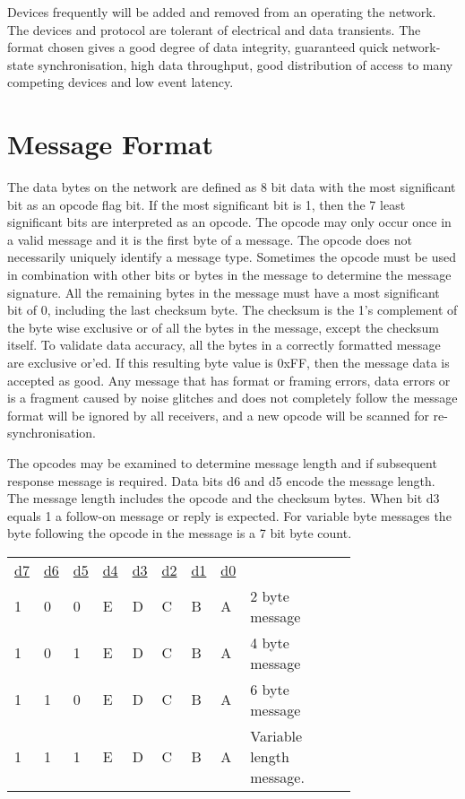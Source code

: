 Devices frequently will be added and removed from an operating the network. The devices and protocol are tolerant of electrical and data transients. The format chosen gives a good degree of data integrity, guaranteed quick network-state synchronisation, high data throughput, good distribution of access to many competing devices and low event latency. 

\section{Message Format}

The data bytes on the network are defined as 8 bit data with the most significant bit as an opcode flag bit. If the most significant bit is 1, then the 7 least significant bits are interpreted as an \gls{opcode}. The opcode may only occur once in a valid message and it is the first byte of a message. The opcode does not necessarily uniquely identify a message type. Sometimes the opcode must be used in combination with other bits or bytes in the \gls{message} to determine the message \gls{signature}. All the remaining bytes in the message must have a most significant bit of 0, including the last checksum byte. The checksum is the 1's complement of the byte wise exclusive or of all the bytes in the message, except the checksum itself. To validate data accuracy, all the bytes in a correctly formatted message are exclusive or'ed. If this resulting byte value is 0xFF, then the message data is accepted as good. Any message that has format or framing errors, data errors or is a fragment caused by noise glitches and does not completely follow the message format will be ignored by all receivers, and a new opcode will be scanned for re-synchronisation.

The opcodes may be examined to determine message length and if subsequent response message is required. Data bits d6 and d5 encode the message length. The message length includes the opcode and the checksum bytes. When bit d3 equals 1 a follow-on message or reply is expected. For variable byte messages the byte following the opcode in the message is a 7 bit byte count.

\begin{tabular}{p{0.05\linewidth} p{0.05\linewidth}  p{0.05\linewidth}  p{0.05\linewidth}  p{0.05\linewidth}  p{0.05\linewidth}  p{0.05\linewidth}  p{0.05\linewidth} p{0.36\linewidth}} 
\underline{d7} & \underline{d6} & \underline{d5} & \underline{d4} & \underline{d3} & \underline{d2} & \underline{d1} & \underline{d0} & \\
1 & 0 & 0 & E & D & C & B & A & 2 byte message\\
1 & 0 & 1 & E & D & C & B & A & 4 byte message\\
1 & 1 & 0 & E & D & C & B & A & 6 byte message\\
1 & 1 & 1 & E & D & C & B & A & Variable length message.\\
\end{tabular}


